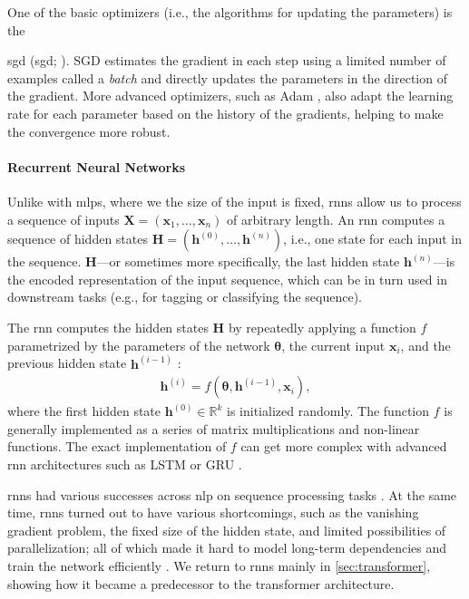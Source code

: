 One of the basic optimizers (i.e., the algorithms for updating the parameters) is the {\acl{sgd} (\acs{sgd}; \citealp[p.~275]{goodfellow2016deep}). SGD estimates the gradient in each step using a limited number of examples called a \emph{batch} and directly updates the parameters in the direction of the gradient. More advanced optimizers, such as Adam \cite{kingma2014adam}, also adapt the learning rate for each parameter based on the history of the gradients, helping to make the convergence more robust.

\paragraph{Recurrent Neural Networks} Unlike with \acp{mlp}, where we the size of the input is fixed, \acp{rnn} allow us to process a sequence of inputs $\mathbf{X} = (\mathbf{x}_1, \ldots, \mathbf{x}_n)$ of arbitrary length. An \ac{rnn} computes a sequence of hidden states $\mathbf{H} = (\mathbf{h}^{(0)}, \ldots, \mathbf{h}^{(n)})$, i.e., one state for each input in the sequence. $\mathbf{H}$---or sometimes more specifically, the last hidden state $\mathbf{h}^{(n)}$---is the encoded representation of the input sequence, which can be in turn used in downstream tasks (e.g., for tagging or classifying the sequence).

The \ac{rnn} computes the hidden states $\mathbf{H}$ by repeatedly applying a function $f$ parametrized by the parameters of the network $\boldsymbol{\theta}$, the current input $\mathbf{x}_i$, and the previous hidden state $\mathbf{h}^{(i-1)}$ \cite[p.~367]{goodfellow2016deep}:
\begin{align}
    \mathbf{h}^{(i)} = f(\boldsymbol{\theta}, \mathbf{h}^{(i-1)}, \mathbf{x}_i),
\end{align}
where the first hidden state $\mathbf{h}^{(0)} \in \mathbb{R}^k$ is initialized randomly.  The function $f$ is generally implemented as a series of matrix multiplications and non-linear functions. The exact implementation of $f$ can get more complex with advanced \ac{rnn} architectures such as LSTM \cite{hochreiter1997long} or GRU \cite{cho2014learning}.

\acp{rnn} had various successes across \ac{nlp} on sequence processing tasks \cite{karpathy2015unreasonable,salehinejad2017recent}. At the same time, \acp{rnn} turned out to have various shortcomings, such as the vanishing gradient problem, the fixed size of the hidden state, and limited possibilities of parallelization; all of which made it hard to model long-term dependencies and train the network efficiently \cite{hochreiter1998vanishing,pascanu2013difficulty}. We return to \acp{rnn} mainly in \autoref{sec:transformer}, showing how it became a predecessor to the transformer architecture.


}
